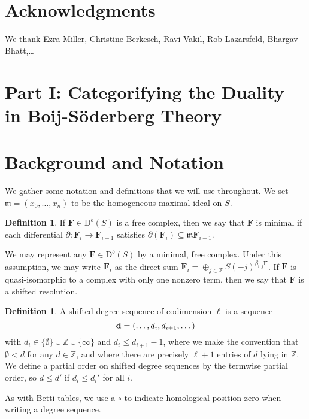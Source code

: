 \documentclass[12pt]{amsart}
\theoremstyle{definition}
\newtheorem{defn}[lemma]{Definition}
\theoremstyle{remark}
\newcommand{\ZZ}{\mathbb{Z}}
\newcommand{\FF}{\mathbf{F}}
\newcommand{\defi}[1]{\textsf{#1}} %
\newcommand{\zp}{\circ}
\newcommand{\DD}{\mathrm{D}}
\begin{document}
\section*{Acknowledgments}
We thank Ezra Miller, Christine Berkesch, Ravi Vakil, Rob Lazarsfeld, Bhargav Bhatt,\dots



\section*{Part I: Categorifying the Duality in Boij-S\"oderberg Theory}
\section{Background and Notation}\label{sec:notation}
We gather some notation and definitions that we will use throughout.  We set $\mathfrak m=(x_0, \dots, x_n)$ to be the homogeneous maximal ideal on $S$.
\begin{defn}
If $\FF\in \DD^b(S)$ is a free complex, then we say that $\FF$ is \defi{minimal} if each differential $\partial: \FF_i\to \FF_{i-1}$ satisfies $\partial(\FF_i)\subseteq \mathfrak m\FF_{i-1}$.
\end{defn}
We may represent any $\FF\in \DD^b(S)$ by a minimal, free complex.  Under this assumption, we may write $\FF_i$ as the direct sum $\FF_i=\oplus_{j\in \ZZ} S(-j)^{\beta_{i,j}\FF}$.  If $\FF$ is quasi-isomorphic to a complex with only one nonzero term, then we say that $\FF$ is a \defi{shifted resolution}.


\begin{defn}
A \defi{shifted degree sequence of codimension $\ell$} is a sequence
\[{\bf d}=(\dots, d_i, d_{i+1}, \dots)
\]
with  $d_{i} \in \{\emptyset\}\cup \ZZ\cup \{\infty\}$ and $d_i \leq d_{i+1}-1$, where we make the convention that $\emptyset<d$ for any $d\in \ZZ$, and 
where there are precisely $\ell+1$ entries of $d$ lying in $\ZZ$. 
We define a partial order on shifted degree sequences by the termwise partial order, so $d\leq d'$ if $d_i\leq d_i'$ for all $i$.

As with Betti tables, we use a $\zp$ to indicate homological position zero when writing a degree sequence. 
\end{defn}
\end{document}

